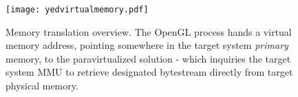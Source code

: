 
\begin{figure}
\centering

\texttt{[image: yedvirtualmemory.pdf]}

\caption[Memory translation overview]{Memory translation overview. The OpenGL process hands a virtual memory address, pointing somewhere in the target system \textit{primary} memory, to the paravirtualized solution - which inquiries the target system MMU to retrieve designated bytestream directly from target physical memory.} %
\label{fig:virtualmemory}

\end{figure}